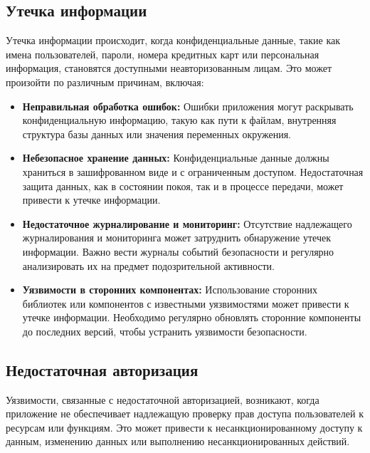 \documentclass[a4paper,12pt]{diplom}
\begin{document}
	 \subsection{Утечка информации}
	 
	 Утечка информации происходит, когда конфиденциальные данные, такие как имена пользователей, пароли, номера кредитных карт или персональная информация, становятся доступными неавторизованным лицам. Это может произойти по различным причинам, включая:
	 
	 \begin{itemize}
	 	\item \textbf{Неправильная обработка ошибок:}  Ошибки приложения могут раскрывать конфиденциальную информацию, такую как пути к файлам, внутренняя структура базы данных или значения переменных окружения.
	 	\item \textbf{Небезопасное хранение данных:}  Конфиденциальные данные должны храниться в зашифрованном виде и с ограниченным доступом. Недостаточная защита данных, как в состоянии покоя, так и в процессе передачи, может привести к утечке информации.
	 	\item \textbf{Недостаточное журналирование и мониторинг:}  Отсутствие надлежащего журналирования и мониторинга может затруднить обнаружение утечек информации. Важно вести журналы событий безопасности и регулярно анализировать их на предмет подозрительной активности.
	 	\item \textbf{Уязвимости в сторонних компонентах:}  Использование сторонних библиотек или компонентов с известными уязвимостями может привести к утечке информации. Необходимо регулярно обновлять сторонние компоненты до последних версий, чтобы устранить уязвимости безопасности.
	 \end{itemize}
	 
	 \subsection{Недостаточная авторизация}
	 
	 Уязвимости, связанные с недостаточной авторизацией, возникают, когда приложение не обеспечивает надлежащую проверку прав доступа пользователей к ресурсам или функциям. Это может привести к несанкционированному доступу к данным, изменению данных или выполнению несанкционированных действий. 
	 
\end{document}
